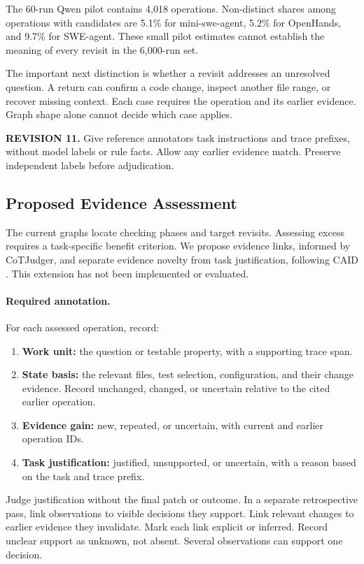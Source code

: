 \documentclass[10pt,a4paper,twocolumn]{article}
\newcommand{\rev}[2]{\par\smallskip\noindent\begin{minipage}{\linewidth}\color{revision}\footnotesize\textbf{REVISION #1.} #2\end{minipage}\par\smallskip}
\begin{document}
The 60-run Qwen pilot contains 4,018 operations. Non-distinct shares among operations with candidates are 5.1\% for mini-swe-agent, 5.2\% for OpenHands, and 9.7\% for SWE-agent. These small pilot estimates cannot establish the meaning of every revisit in the 6,000-run set.

The important next distinction is whether a revisit addresses an unresolved question. A return can confirm a code change, inspect another file range, or recover missing context. Each case requires the operation and its earlier evidence. Graph shape alone cannot decide which case applies.
\rev{11}{Give reference annotators task instructions and trace prefixes, without model labels or rule facts. Allow any earlier evidence match. Preserve independent labels before adjudication.}

\subsection{Proposed Evidence Assessment}\label{sec:assessment}
The current graphs locate checking phases and target revisits. Assessing excess requires a task-specific benefit criterion. We propose evidence links, informed by CoTJudger, and separate evidence novelty from task justification, following CAID \citep{cotjudger,caid}. This extension has not been implemented or evaluated.

\paragraph{Required annotation.}
For each assessed operation, record:
\begin{enumerate}
\setlength{\itemsep}{1pt}\setlength{\topsep}{3pt}
\item \textbf{Work unit:} the question or testable property, with a supporting trace span.
\item \textbf{State basis:} the relevant files, test selection, configuration, and their change evidence. Record unchanged, changed, or uncertain relative to the cited earlier operation.
\item \textbf{Evidence gain:} new, repeated, or uncertain, with current and earlier operation IDs.
\item \textbf{Task justification:} justified, unsupported, or uncertain, with a reason based on the task and trace prefix.
\end{enumerate}
Judge justification without the final patch or outcome. In a separate retrospective pass, link observations to visible decisions they support. Link relevant changes to earlier evidence they invalidate. Mark each link explicit or inferred. Record unclear support as unknown, not absent. Several observations can support one decision.
\end{document}
